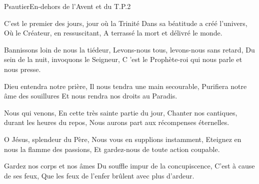 \documentclass[psautier_nocturne_fr.tex]{subfiles}
\begin{document}
	{Psautier}{En-dehors de l'Avent et du T.P.}{2}{}{}{}{}{}{}







C'est le premier des jours, jour où la Trinité
Dans sa béatitude a créé l'univers,
Où le Créateur, en ressuscitant,
A terrassé la mort et délivré le monde.

Bannissons loin de nous la tiédeur,
Levons-nous tous, levons-nous sans retard,
Du sein de la nuit, invoquons le Seigneur,
C 'est le Prophète-roi qui nous parle et nous presse.

Dieu entendra notre prière,
Il nous tendra une main secourable,
Purifiera notre âme des souillures
Et nous rendra nos droits au Paradis.

Nous qui venons,
En cette très sainte partie du jour,
Chanter nos cantiques, durant les heures du repos,
Nous aurons part aux récompenses éternelles.

O Jésus, splendeur du Père,
Nous vous en supplions instamment,
Eteignez en nous la flamme des passions,
Et gardez-nous de toute action coupable.

Gardez nos corps et nos âmes
Du souffle impur de la concupiscence,
C'est à cause de ses feux,
Que les feux de l'enfer brûlent avec plus d'ardeur.
\end{document}
